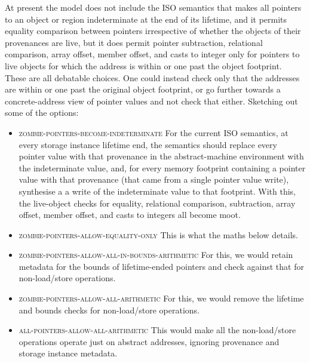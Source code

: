 \documentclass[acmsmall,review,screen]{acmart}\settopmatter{printfolios=true,printccs=false,printacmref=false}
\begin{document}
At present the model does not include the ISO semantics that makes all
pointers to an object or region indeterminate at the end of its
lifetime, and it permits equality comparison between pointers
irrespective of whether the objects of their provenances are live,
but it does permit pointer subtraction, relational comparison, array
offset, member offset, and casts to integer only for pointers to live
objects for which the address is within or one past the object
footprint.  These are all debatable choices.  One could instead check
only that the addresses are within or one past the original object
footprint, or go further towards a concrete-address view of pointer
values and not check that either.  Sketching out some of the options:
\begin{itemize}
\item \textsc{zombie-pointers-become-indeterminate}  For the current
  ISO semantics, at every storage instance lifetime end, the semantics
  should replace every pointer value with that provenance in the
  abstract-machine environment with the indeterminate value, and, for
  every memory footprint containing a pointer value with that
  provenance (that came from a single pointer value write), synthesise a 
  a write of the indeterminate value to that footprint.  With this,
  the live-object checks for equality, relational comparison,
  subtraction, array offset, member offset, and casts to integers all
  become moot. 
\item \textsc{zombie-pointers-allow-equality-only}  This is what the
  maths below details. 
\item \textsc{zombie-pointers-allow-all-in-bounds-arithmetic}
  For this, we would retain metadata for the bounds of lifetime-ended
  pointers and check against that for non-load/store operations.
\item \textsc{zombie-pointers-allow-all-arithmetic}  For this, we
  would remove the lifetime and bounds checks for non-load/store operations.
\item \textsc{all-pointers-allow-all-arithmetic}  This would make all
  the non-load/store operations operate just on abstract addresses,
  ignoring provenance and storage instance metadata.
\end{itemize}
\end{document}
